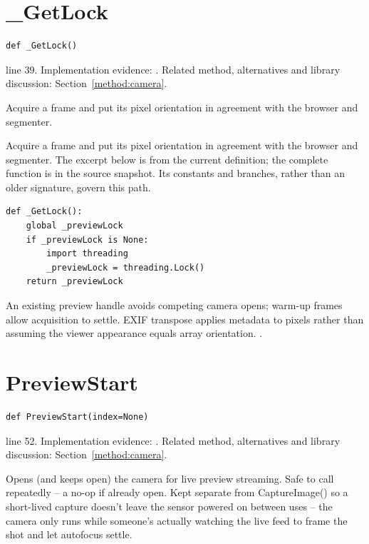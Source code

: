 \section{\_GetLock}\label{fn:web-camera:-GetLock}
\begin{lstlisting}[style=sig]
def _GetLock()
\end{lstlisting}
 line 39. Implementation evidence: \cite{code2026}. Related method, alternatives and library discussion: Section~\ref{method:camera}.


Acquire a frame and put its pixel orientation in agreement with the browser and segmenter.


Acquire a frame and put its pixel orientation in agreement with the browser and segmenter. The excerpt below is from the current definition; the complete function is in the source snapshot. Its constants and branches, rather than an older signature, govern this path.


\begin{lstlisting}[style=plain]
def _GetLock():
    global _previewLock
    if _previewLock is None:
        import threading
        _previewLock = threading.Lock()
    return _previewLock
\end{lstlisting}
An existing preview handle avoids competing camera opens; warm-up frames allow acquisition to settle. EXIF transpose applies metadata to pixels rather than assuming the viewer appearance equals array orientation. \cite{opencvcamera,pillowops}.


\section{PreviewStart}\label{fn:web-camera:PreviewStart}
\begin{lstlisting}[style=sig]
def PreviewStart(index=None)
\end{lstlisting}
 line 52. Implementation evidence: \cite{code2026}. Related method, alternatives and library discussion: Section~\ref{method:camera}.


Opens (and keeps open) the camera for live preview streaming. Safe to call repeatedly -- a no-op if already open. Kept separate from CaptureImage() so a short-lived capture doesn't leave the sensor powered on between uses -- the camera only runs while someone's actually watching the live feed to frame the shot and let autofocus settle.


